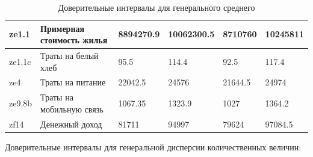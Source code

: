 \documentclass[12pt]{report}
\begin{document}
\begin{table}[H]
\begin{tabular}{|l|l|l|l|l|l|}
  ze1.1   & Примерная стоимость жилья  & 8894270.9                                                                         & 10062300.5                                                                        & 8710760                                                                           & 10245811                                                                          \\ \hline
  ze1.1c  & Траты на белый хлеб        & 95.5                                                                              & 114.4                                                                             & 92.5                                                                              & 117.4                                                                             \\ \hline
  ze4     & Траты на питание           & 22042.5                                                                           & 24576                                                                             & 21644.5                                                                           & 24974                                                                             \\ \hline
  ze9.8b  & Траты на мобильную связь   & 1067.35                                                                           & 1323.9                                                                            & 1027                                                                              & 1364.2                                                                            \\ \hline
  zf14    & Денежный доход             & 81711                                                                             & 94997                                                                             & 79624                                                                             & 97084.5                                                                           \\ \hline
  \end{tabular}
  \caption{Доверительные интервалы для генерального среднего}
  \end{table}
  Доверительные интервалы для генеральной дисперсии количественных величин:
\end{document}
